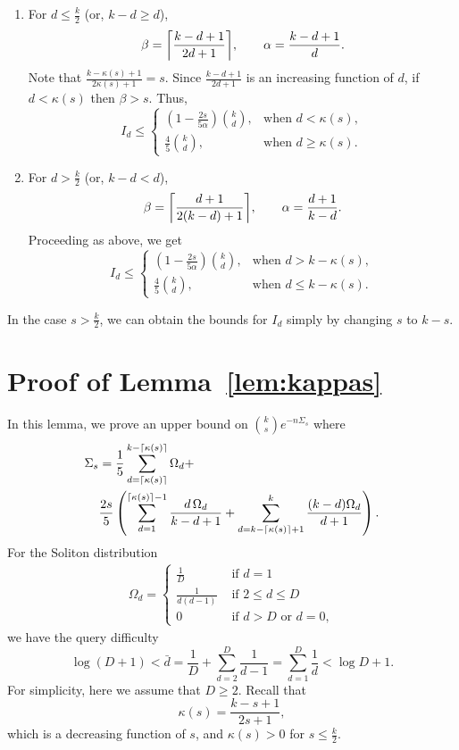 \documentclass[11pt,onecolumn]{IEEEtran}
\newcommand{\beq}{\begin{equation}}
\newcommand{\eeq}{\end{equation}}
\newcommand{\bard}{\bar{d}}
\DeclarePairedDelimiter\ceil{\lceil}{\rceil}
\begin{document}
\begin{enumerate}
	\item For $d \leq \frac{k}{2}$ (or, $k-d \geq d$),
	$$
	\beta = \ceil*{\frac{k-d+1}{2d+1}}, \qquad \alpha = \frac{k-d+1}{d}.
	$$
	Note that $\frac{k-\kappa(s)+1}{2\kappa(s)+1} = s$. Since $\frac{k-d+1}{2d+1}$ is an increasing function of $d$, if $d < \kappa(s)$ then $\beta > s$. Thus,
	\beq
	I_d \leq \begin{cases}
	\left(1- \frac{2s}{5\alpha}\right){k\choose d},& \text{when } d < \kappa(s), \\
	\frac{4}{5}{k\choose d}, & \text{when } d \geq \kappa(s).
	\end{cases}
	\eeq
		
	\item For $d > \frac{k}{2}$ (or, $k-d < d$),
	$$
	\beta = \ceil*{\frac{d+1}{2(k-d)+1}}, \qquad \alpha = \frac{d+1}{k-d}.
	$$
	Proceeding as above, we get
	\beq
	I_d \leq \begin{cases}
	\left(1- \frac{2s}{5\alpha}\right){k\choose d},& \text{when } d > k-\kappa(s), \\
	\frac{4}{5}{k\choose d}, & \text{when } d \leq k-\kappa(s).
	\end{cases}
	\eeq

\end{enumerate}
In the case $s > \frac{k}{2}$, we can obtain the bounds for $I_d$ simply by changing $s$ to $k-s$. 

\section{Proof of Lemma~\ref{lem:kappas}}\label{app:lem:kappas}
In this lemma, we prove an upper bound on ${k\choose s}e^{-n\Sigma_s}$ where
\beq
\begin{split}
\Sigma_s &= \frac{1}{5} \sum_{d=\ceil*{\kappa(s)}}^{k-\ceil*{\kappa(s)}} \Omega_d + \\
&\frac{2s}{5} \left( \sum_{d=1}^{\ceil*{\kappa(s)}-1} \frac{d\,\Omega_d}{k-d+1} + \sum_{d=k-\ceil*{\kappa(s)}+1}^{k} \frac{(k-d)\Omega_d}{d+1} \right).
\end{split}
\eeq
For the Soliton distribution
\beq
\begin{aligned}\nonumber
\Omega_d = 
	\begin{cases}
	\frac{1}{D} & \text{ if } d=1 \\
	\frac{1}{d(d-1)} & \text{ if } 2\leq d \leq D \\
	0 & \text{ if } d > D\text{ or }d=0,
	\end{cases}
\end{aligned}
\eeq
we have the query difficulty
$$
\log (D+1) < \bard = \frac{1}{D} + \sum_{d=2}^{D} \frac{1}{d-1} = \sum_{d=1}^D \frac{1}{d} < \log D + 1.
$$
For simplicity, here we assume that $D \geq 2$.
Recall that
\beq
\kappa(s) = \frac{k-s+1}{2s+1},
\eeq
which is a decreasing function of $s$, and $\kappa(s) > 0$ for $s \leq \frac{k}{2}$.
\end{document}
